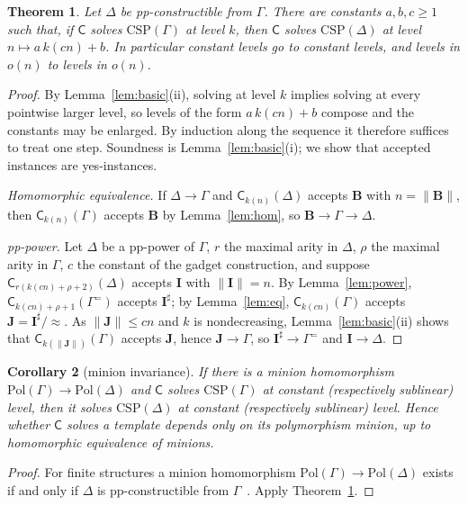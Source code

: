 \documentclass[11pt]{article}
\newtheorem{theorem}{Theorem}[section]
\newtheorem{corollary}[theorem]{Corollary}
\theoremstyle{definition}
\theoremstyle{remark}
\newcommand{\Pol}{\mathrm{Pol}}
\newcommand{\Csp}{\mathrm{CSP}}
\newcommand{\Coh}{\mathsf{C}}
\newcommand{\size}[1]{\lVert #1\rVert}
\begin{document}
\begin{theorem}\label{thm:main}
Let $\Delta$ be pp-constructible from $\Gamma$. There are constants
$a,b,c\ge1$ such that, if $\Coh$ solves $\Csp(\Gamma)$ at level $k$, then
$\Coh$ solves $\Csp(\Delta)$ at level $n\mapsto a\,k(cn)+b$. In particular
constant levels go to constant levels, and levels in $o(n)$ to levels in
$o(n)$.
\end{theorem}
\begin{proof}
By Lemma~\ref{lem:basic}(ii), solving at level $k$ implies solving at every
pointwise larger level, so levels of the form $a\,k(cn)+b$ compose and the
constants may be enlarged. By induction along the sequence it therefore
suffices to treat one step. Soundness is Lemma~\ref{lem:basic}(i); we show that
accepted instances are yes-instances.

\emph{Homomorphic equivalence.} If $\Delta\to\Gamma$ and
$\Coh_{k(n)}(\Delta)$ accepts $\mathbf B$ with $n=\size{\mathbf B}$, then
$\Coh_{k(n)}(\Gamma)$ accepts $\mathbf B$ by Lemma~\ref{lem:hom}, so
$\mathbf B\to\Gamma\to\Delta$.

\emph{pp-power.} Let $\Delta$ be a pp-power of $\Gamma$, $r$ the maximal arity
in $\Delta$, $\rho$ the maximal arity in $\Gamma$, $c$ the constant of the
gadget construction, and suppose $\Coh_{r(k(cn)+\rho+2)}(\Delta)$ accepts
$\mathbf I$ with $\size{\mathbf I}=n$. By Lemma~\ref{lem:power},
$\Coh_{k(cn)+\rho+1}(\Gamma^=)$ accepts $\mathbf I^\sharp$; by
Lemma~\ref{lem:eq}, $\Coh_{k(cn)}(\Gamma)$ accepts
$\mathbf J=\mathbf I^\sharp/{\approx}$. As $\size{\mathbf J}\le cn$ and $k$ is
nondecreasing, Lemma~\ref{lem:basic}(ii) shows that
$\Coh_{k(\size{\mathbf J})}(\Gamma)$ accepts $\mathbf J$, hence
$\mathbf J\to\Gamma$, so $\mathbf I^\sharp\to\Gamma^=$ and
$\mathbf I\to\Delta$.
\end{proof}

\begin{corollary}[minion invariance]\label{cor:minion}
If there is a minion homomorphism $\Pol(\Gamma)\to\Pol(\Delta)$ and $\Coh$
solves $\Csp(\Gamma)$ at constant (respectively sublinear) level, then it
solves $\Csp(\Delta)$ at constant (respectively sublinear) level. Hence
whether $\Coh$ solves a template depends only on its polymorphism minion, up to
homomorphic equivalence of minions.
\end{corollary}
\begin{proof}
For finite structures a minion homomorphism $\Pol(\Gamma)\to\Pol(\Delta)$
exists if and only if $\Delta$ is pp-constructible from
$\Gamma$~\cite{BOP18}. Apply Theorem~\ref{thm:main}.
\end{proof}
\end{document}
